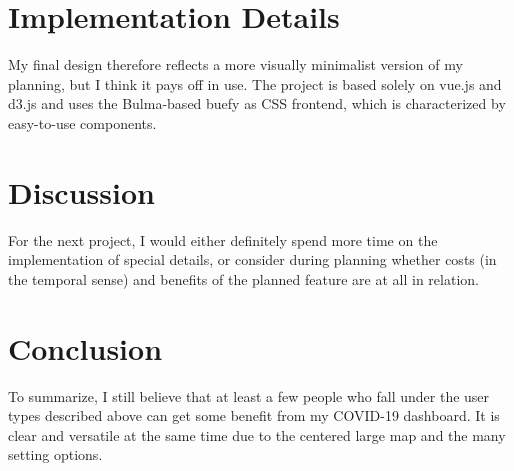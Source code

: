 \documentclass[11pt]{article}
\begin{document}
\section{Implementation Details}
My final design therefore reflects a more visually minimalist version of my planning, but I think it pays off in use.
The project is based solely on vue.js and d3.js and uses the Bulma-based buefy as CSS frontend, which is characterized by easy-to-use components.

\section{Discussion}
For the next project, I would either definitely spend more time on the implementation of special details, or consider during planning whether
costs (in the temporal sense) and benefits of the planned feature are at all in relation.

\section{Conclusion}
To summarize, I still believe that at least a few people who fall under the user types described above can get some benefit from my COVID-19 dashboard.
It is clear and versatile at the same time due to the centered large map and the many setting options.
\end{document}
